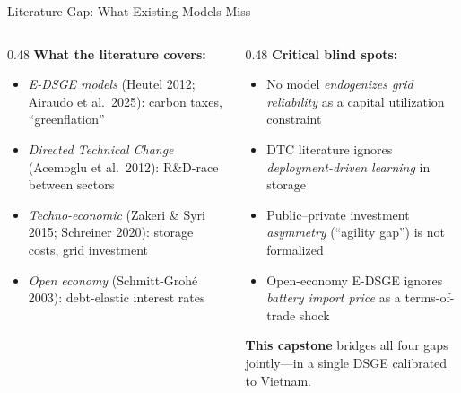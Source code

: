 \documentclass[aspectratio=169,10pt]{beamer}
\begin{document}
\begin{frame}{Literature Gap: What Existing Models Miss}
  \begin{columns}[T]
    \begin{column}{0.48\textwidth}
      \textbf{\textcolor{fuvblue}{What the literature covers:}}
      \begin{itemize}\small
        \item \textit{E-DSGE models} (Heutel 2012; Airaudo et al.\ 2025): carbon taxes, ``greenflation''
        \item \textit{Directed Technical Change} (Acemoglu et al.\ 2012): R\&D-race between sectors
        \item \textit{Techno-economic} (Zakeri \& Syri 2015; Schreiner 2020): storage costs, grid investment
        \item \textit{Open economy} (Schmitt-Grohé 2003): debt-elastic interest rates
      \end{itemize}
    \end{column}
    \begin{column}{0.48\textwidth}
      \textbf{\textcolor{fuvred}{Critical blind spots:}}
      \begin{itemize}\small
        \item No model \textit{endogenizes grid reliability} as a capital utilization constraint
        \item DTC literature ignores \textit{deployment-driven learning} in storage
        \item Public--private investment \textit{asymmetry} (``agility gap'') is not formalized
        \item Open-economy E-DSGE ignores \textit{battery import price} as a terms-of-trade shock
      \end{itemize}
      \vspace{0.3em}
      \begin{keybox}
        \small \textbf{This capstone} bridges all four gaps jointly---in a single DSGE calibrated to Vietnam.
      \end{keybox}
    \end{column}
  \end{columns}
\end{frame}
\end{document}
